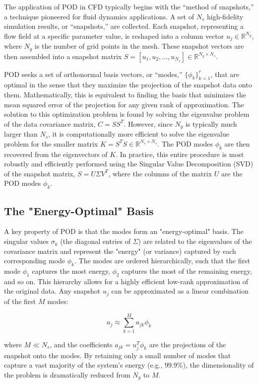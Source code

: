 \documentclass[dscexam, EN]{ufabcFHZh}
\begin{document}
The application of POD in CFD typically begins with the ``method of snapshots,'' a technique pioneered for fluid dynamics applications. A set of $N_s$ high-fidelity simulation results, or ``snapshots,'' are collected. Each snapshot, representing a flow field at a specific parameter value, is reshaped into a column vector $u_j \in \mathbb{R}^{N_g}$, where $N_g$ is the number of grid points in the mesh. These snapshot vectors are then assembled into a snapshot matrix $S=[u_1, u_2, ..., u_{N_s}] \in \mathbb{R}^{N_g \times N_s}$.

POD seeks a set of orthonormal basis vectors, or ``modes,'' $\{\phi_k\}_{k=1}^r$, that are optimal in the sense that they maximize the projection of the snapshot data onto them. Mathematically, this is equivalent to finding the basis that minimizes the mean squared error of the projection for any given rank of approximation. The solution to this optimization problem is found by solving the eigenvalue problem of the data covariance matrix, $C=SS^T$. However, since $N_g$ is typically much larger than $N_s$, it is computationally more efficient to solve the eigenvalue problem for the smaller matrix $K=S^TS \in \mathbb{R}^{N_s \times N_s}$. The POD modes $\phi_k$ are then recovered from the eigenvectors of $K$. In practice, this entire procedure is most robustly and efficiently performed using the Singular Value Decomposition (SVD) of the snapshot matrix, $S=U\Sigma V^T$, where the columns of the matrix $U$ are the POD modes $\phi_k$.

\subsection{The "Energy-Optimal" Basis}

A key property of POD is that the modes form an "energy-optimal" basis. The singular values $\sigma_k$ (the diagonal entries of $\Sigma$) are related to the eigenvalues of the covariance matrix and represent the "energy" (or variance) captured by each corresponding mode $\phi_k$. The modes are ordered hierarchically, such that the first mode $\phi_1$ captures the most energy, $\phi_2$ captures the most of the remaining energy, and so on. This hierarchy allows for a highly efficient low-rank approximation of the original data. Any snapshot $u_j$ can be approximated as a linear combination of the first $M$ modes:

$$u_j \approx \sum_{k=1}^{M} a_{jk} \phi_k$$

where $M \ll N_s$, and the coefficients $a_{jk} = u_j^T \phi_k$ are the projections of the snapshot onto the modes. By retaining only a small number of modes that capture a vast majority of the system's energy (e.g., 99.9\%), the dimensionality of the problem is dramatically reduced from $N_g$ to $M$.
\end{document}
